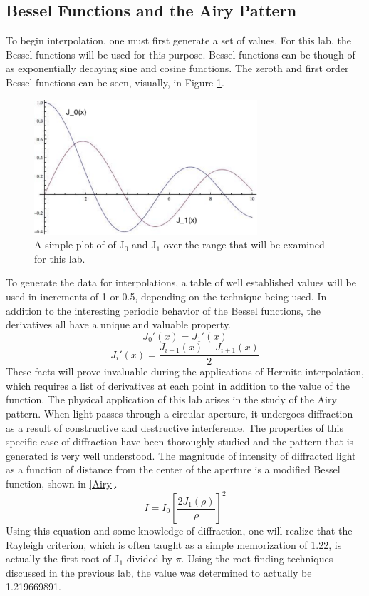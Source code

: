 \documentclass[12pt]{article}
\begin{document}
\subsection{Bessel Functions and the Airy Pattern}
To begin interpolation, one must first generate a set of values.  For this lab, the Bessel functions will be used for this purpose.   Bessel functions can be though of as exponentially decaying sine and cosine functions.  The zeroth and first order Bessel functions can be seen, visually, in Figure \ref{fig:J0J1}.
\begin{figure}[!h]
\centering
\includegraphics[width =100 mm, height = 50mm]{Bessel.pdf}
\caption{A simple plot of of J$_0$ and J$_1$ over the range that will be examined for this lab.}
\label{fig:J0J1}
\end{figure}
To generate the data for interpolations, a table of well established values will be used in increments of 1 or 0.5, depending on the technique being used.  In addition to the interesting periodic behavior of the Bessel functions, the derivatives all have a unique and valuable property.
\begin{equation}
\label{J0'}
J_0'(x) = J_1'(x)
\end{equation}
\begin{equation}
\label{Ji'}
J_i'(x) = \frac{J_{i-1}(x)-J_{i+1}(x)}{2}
\end{equation}
These facts will prove invaluable during the applications of Hermite interpolation, which requires a list of derivatives at each point in addition to the value of the function.
The physical application of this lab arises in the study of the Airy pattern.  When light passes through a circular aperture, it undergoes diffraction as a result of constructive and destructive interference.  The properties of this specific case of diffraction have been thoroughly studied and the pattern that is generated is very well understood.  The magnitude of intensity of diffracted light as a function of distance from the center of the aperture is a modified Bessel function, shown in \eqref{Airy}.
\begin{equation}
\label{Airy}
I = I_0 [\frac{2 J_1(\rho)}{\rho}]^2
\end{equation}
Using this equation and some knowledge of diffraction, one will realize that the Rayleigh criterion, which is often taught as a simple memorization of 1.22, is actually the first root of J$_1$ divided by $\pi$.  Using the root finding techniques discussed in the previous lab, the value was determined to actually be 1.219669891.
\end{document}
